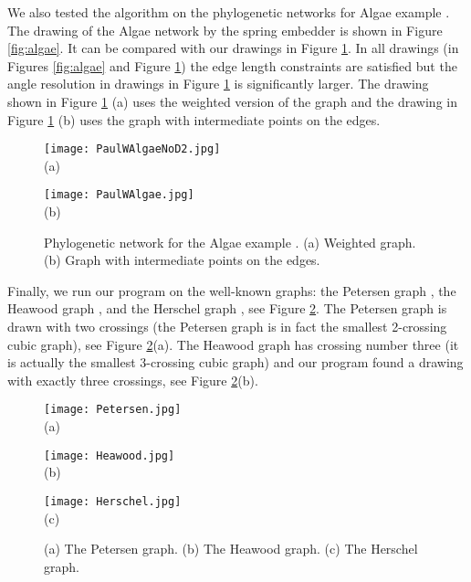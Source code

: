 \documentclass[10pt]{article}
\begin{document}
We also tested the algorithm on the phylogenetic networks for Algae example \cite{pb-opn-12}.
The drawing of the Algae network by  the spring embedder \cite{embedder} is shown in Figure 
\ref{fig:algae}. It can be compared with our drawings in Figure \ref{algae}. 
In all drawings (in Figures \ref{fig:algae} and Figure \ref{algae}) the edge length constraints are
satisfied but the angle resolution in drawings in Figure \ref{algae} is significantly larger. 
The drawing shown in Figure \ref{algae} (a) uses the weighted version of the graph and the drawing in Figure \ref{algae} (b) uses the graph with  intermediate points on the edges. 

\begin{figure}[htp]
\centering
\begin{minipage}[b]{0.45\linewidth}
\centering \texttt{[image: PaulWAlgaeNoD2.jpg]}\\ (a)
\end{minipage}
\begin{minipage}[b]{0.45\linewidth}
\centering \texttt{[image: PaulWAlgae.jpg]}\\ (b)
\end{minipage}
\caption{Phylogenetic network for the Algae example \cite{pb-opn-12}.
(a) Weighted graph. (b) Graph with intermediate points on the edges.}
\label{algae}
\end{figure}

Finally, we run our program on the well-known graphs: 
the Petersen graph \cite{hs-93}, the Heawood graph \cite{har-91}, and 
the Herschel graph \cite{bh-81}, see Figure \ref{well}.
The Petersen graph is drawn with two crossings (the Petersen graph is in fact the 
smallest 2-crossing cubic graph), see Figure \ref{well}(a).
The Heawood graph has crossing number three (it is actually the smallest 3-crossing cubic graph) and our program found a drawing with exactly three crossings, see Figure \ref{well}(b).


\begin{figure}[htp]
\centering
\begin{minipage}[b]{0.31\linewidth}
\centering \texttt{[image: Petersen.jpg]}\\ (a)
\end{minipage}
\begin{minipage}[b]{0.31\linewidth}
\centering \texttt{[image: Heawood.jpg]}\\ (b)
\end{minipage}
\begin{minipage}[b]{0.31\linewidth}
\centering \texttt{[image: Herschel.jpg]}\\ (c)
\end{minipage}
\caption{(a) The Petersen graph. (b) The Heawood graph.
(c) The Herschel graph.}
\label{well}
\end{figure}
\end{document}
